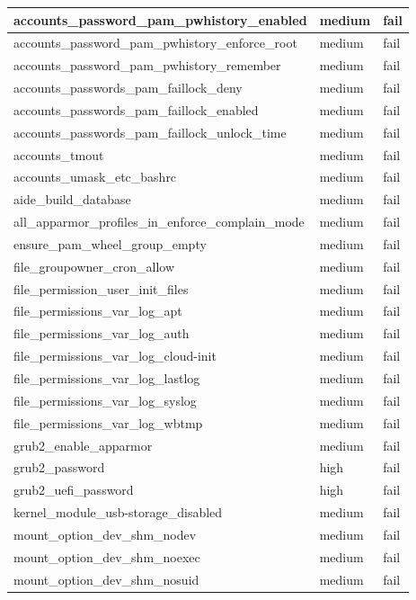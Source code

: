 \begin{longtable}{|p{10cm}|p{2cm}|p{2cm}|}
accounts\_password\_pam\_pwhistory\_enabled & medium & fail \\
\hline
accounts\_password\_pam\_pwhistory\_enforce\_root & medium & fail \\
\hline
accounts\_password\_pam\_pwhistory\_remember & medium & fail \\
\hline
accounts\_passwords\_pam\_faillock\_deny & medium & fail \\
\hline
accounts\_passwords\_pam\_faillock\_enabled & medium & fail \\
\hline
accounts\_passwords\_pam\_faillock\_unlock\_time & medium & fail \\
\hline
accounts\_tmout & medium & fail \\
\hline
accounts\_umask\_etc\_bashrc & medium & fail \\
\hline
aide\_build\_database & medium & fail \\
\hline
all\_apparmor\_profiles\_in\_enforce\_complain\_mode & medium & fail \\
\hline
ensure\_pam\_wheel\_group\_empty & medium & fail \\
\hline
file\_groupowner\_cron\_allow & medium & fail \\
\hline
file\_permission\_user\_init\_files & medium & fail \\
\hline
file\_permissions\_var\_log\_apt & medium & fail \\
\hline
file\_permissions\_var\_log\_auth & medium & fail \\
\hline
file\_permissions\_var\_log\_cloud-init & medium & fail \\
\hline
file\_permissions\_var\_log\_lastlog & medium & fail \\
\hline
file\_permissions\_var\_log\_syslog & medium & fail \\
\hline
file\_permissions\_var\_log\_wbtmp & medium & fail \\
\hline
grub2\_enable\_apparmor & medium & fail \\
\hline
grub2\_password & high & fail \\
\hline
grub2\_uefi\_password & high & fail \\
\hline
kernel\_module\_usb-storage\_disabled & medium & fail \\
\hline
mount\_option\_dev\_shm\_nodev & medium & fail \\
\hline
mount\_option\_dev\_shm\_noexec & medium & fail \\
\hline
mount\_option\_dev\_shm\_nosuid & medium & fail \\

\end{longtable}
